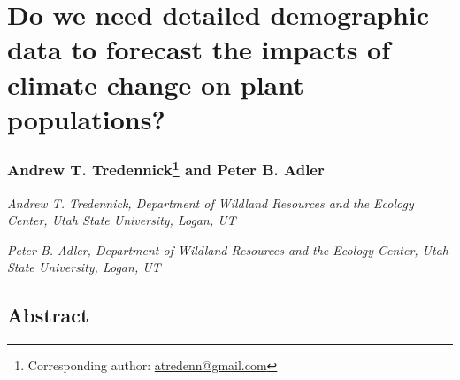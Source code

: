 \documentclass[12pt,]{article}
\author{}
\date{}
\begin{document}
\normalsize


\section{Do we need detailed demographic data to forecast the impacts of
climate change on plant
populations?}\label{do-we-need-detailed-demographic-data-to-forecast-the-impacts-of-climate-change-on-plant-populations}

\subsubsection[Andrew T. Tredennick and Peter B. Adler]{Andrew T.
Tredennick\footnote{Corresponding author:
  \href{mailto:atredenn@gmail.com}{\href{mailto:atredenn@gmail.com}{atredenn@gmail.com}}}
and Peter B.
Adler}\label{andrew-t.-tredennickcorrauth-and-peter-b.-adler}

\emph{Andrew T. Tredennick, Department of Wildland Resources and the
Ecology Center, Utah State University, Logan, UT}

\emph{Peter B. Adler, Department of Wildland Resources and the Ecology
Center, Utah State University, Logan, UT}

\newpage{}

\subsection{Abstract}\label{abstract}
\end{document}
